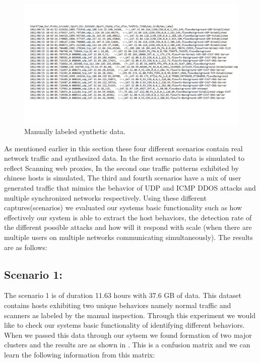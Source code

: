\begin{figure}[b]
	\centerline{\includegraphics[trim=4cm 3cm 3cm 3cm, scale = 0.5]{ss_labeled.pdf}}
	\caption{Manually labeled synthetic data.}%
\end{figure}

As mentioned earlier in this section these four different scenarios contain real network traffic and synthesized data. In the first scenario data is simulated to reflect Scanning web proxies, In the second one traffic patterns exhibited by chinese hosts is simulated, The third and fourth scenarios have a mix of user generated traffic that mimics the behavior of UDP and ICMP DDOS attacks and multiple synchronized networks respectively. Using these different captures(scenarios) we evaluated our systems basic functionality such as how effectively our system is able to extract the host behaviors, the detection rate of the different possible attacks and how will it respond with scale (when there are multiple users on multiple networks communicating simultaneously). The results are as follows:

\subsection{Scenario 1:}
The scenario 1 is of duration 11.63 hours with 37.6 GB of data. This dataset contains hosts exhibiting two unique behaviors namely normal traffic and scanners as labeled by the manual inspection. Through this experiment we would like to check our systems basic functionality of identifying different behaviors. When we passed this data through our sytsem we found formation of two major clusters and the results are as shown in  . This is a confusion matrix and we can learn the following information from this matrix:

